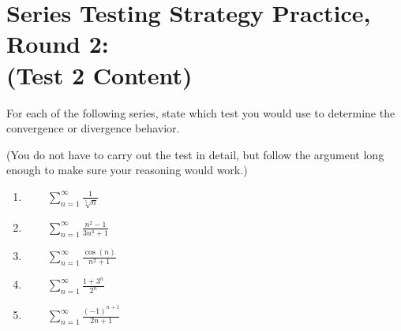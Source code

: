 \section*{ Series Testing Strategy Practice, Round 2:\\(Test 2 Content) }


For each of the following series, state which test you would use to determine the convergence or divergence behavior. %

(You do not have to carry out the test in detail, but follow the argument long enough to make sure your reasoning would work.)


\begin{enumerate}

\item \(\qquad \sum_{n=1}^\infty \frac{1}{\sqrt[5]{n}}\)\vfill

\item \(\qquad \sum_{n=1}^\infty \frac{n^2-1}{3n^4+1}\)\vfill

\item \(\qquad \sum_{n=1}^\infty \frac{\cos(n)}{n^2+1}\)\vfill

\item \(\qquad \sum_{n=1}^\infty \frac{1+3^n}{2^n}\)\vfill

\item \(\qquad \sum_{n=1}^\infty \frac{(-1)^{n+1}}{2n+1}\)\vfill



\end{enumerate}



